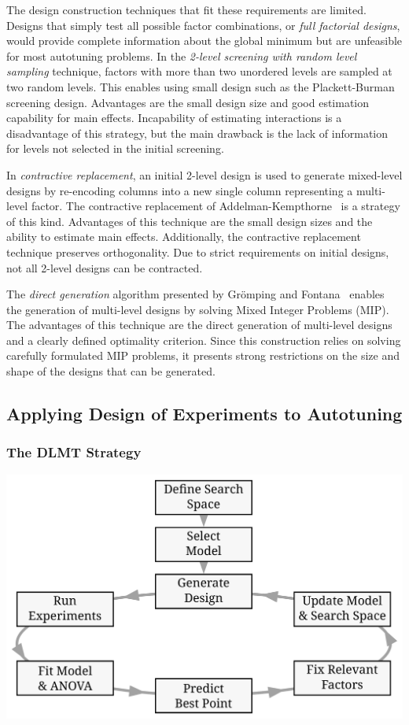 \documentclass[conference]{IEEEtran}
\begin{document}
The design construction techniques that fit these requirements are limited.
Designs that simply test all possible factor combinations, or \emph{full factorial
designs}, would provide complete information about the global minimum but are
unfeasible for most autotuning problems. In the \emph{2-level screening with random
level sampling} technique, factors with more than two unordered levels are
sampled at two random levels. This enables using small design such as the
Plackett-Burman~\cite{plackett1946design} screening design. Advantages are
the small design size and good estimation capability for main effects.
Incapability of estimating interactions is a disadvantage of this strategy, but
the main drawback is the lack of information for levels not selected in the
initial screening.

In \emph{contractive replacement}, an initial 2-level design is used to generate
mixed-level designs by re-encoding columns into a new single column representing
a multi-level factor. The contractive replacement of
Addelman-Kempthorne~\cite{addelman1961some} is a strategy of this kind.
Advantages of this technique are the small design sizes and the ability to
estimate main effects. Additionally, the contractive replacement technique
preserves orthogonality. Due to strict requirements on initial designs, not all
2-level designs can be contracted.

The \emph{direct generation} algorithm presented by Grömping and
Fontana~\cite{ulrike2018algorithm} enables the generation of multi-level
designs by solving Mixed Integer Problems (MIP). The advantages of this
technique are the direct generation of multi-level designs and a clearly defined
optimality criterion. Since this construction relies on solving carefully
formulated MIP problems, it presents strong restrictions on the size and shape
of the designs that can be generated.
\subsection{Applying Design of Experiments to Autotuning}
\label{sec:org7269ac0}
\subsubsection{The DLMT Strategy}
\label{sec:org4a991e2}
\begin{center}
\begin{center}
\includegraphics[width=.8\columnwidth]{./img/doe_anova_strategy.pdf}
\end{center}
\end{center}
\end{document}
